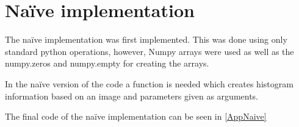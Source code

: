 \section{Na\"ive implementation}
The na\"ive implementation was first implemented. This was done using only standard python operations, however, Numpy arrays were used as well as the numpy.zeros and numpy.empty for creating the arrays. 

In the na\"ive version of the code a function is needed which creates histogram information based on an image and parameters given as arguments.


The final code of the na\"ive implementation can be seen in \autoref{AppNaive}